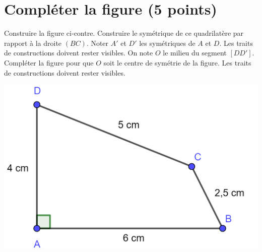 \section{Compléter la figure (5 points)}

\begin{multicols}{2}
	\begin{questions}
		\question[1] Construire la figure ci-contre.
		\question[2] Construire le symétrique de ce quadrilatère par rapport à la droite $(BC)$. Noter $A'$ et $D'$ les symétriques de $A$ et $D$. Les traits de constructions doivent rester visibles.
		\question[2] On note $O$ le milieu du segment $[DD']$. Compléter la figure pour que $O$ soit le centre de symétrie de la figure. Les traits de constructions doivent rester visibles.
	\end{questions}

	\begin{center}
		\includegraphics[scale=0.25]{img/cons}
	\end{center}
\end{multicols}